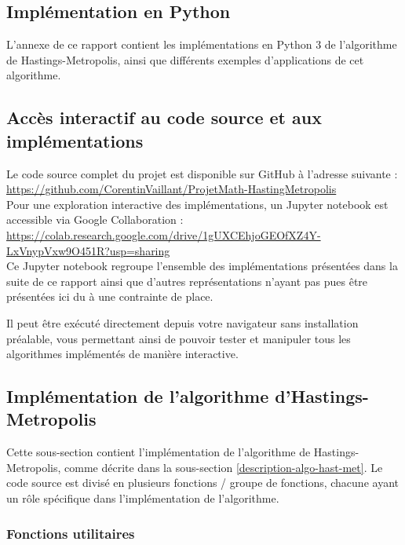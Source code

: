 \documentclass{article}
\begin{document}
\subsection{Implémentation en Python}

L'annexe de ce rapport contient les implémentations en Python 3 de l'algorithme de Hastings-Metropolis, ainsi que différents exemples d'applications de cet algorithme.

\subsection{Accès interactif au code source et aux implémentations}
Le code source complet du projet est disponible sur GitHub à l'adresse suivante : \url{https://github.com/CorentinVaillant/ProjetMath-HastingMetropolis} \\

Pour une exploration interactive des implémentations, un Jupyter notebook est accessible via Google Collaboration : \url{https://colab.research.google.com/drive/1gUXCEhjoGEOfXZ4Y-LxVnypVxw9O451R?usp=sharing} \\

Ce Jupyter notebook regroupe l'ensemble des implémentations présentées dans la suite de ce rapport ainsi que d'autres représentations n'ayant pas pues être présentées ici du à une contrainte de place.

Il peut être exécuté directement depuis votre navigateur sans installation préalable, vous permettant ainsi de pouvoir tester et manipuler tous les algorithmes implémentés de manière interactive.

\newpage
\subsection{Implémentation de l'algorithme d'Hastings-Metropolis}

Cette sous-section contient l'implémentation de l'algorithme de Hastings-Metropolis, comme décrite dans la sous-section \ref{description-algo-hast-met}. Le code source est divisé en plusieurs fonctions / groupe de fonctions, chacune ayant un rôle spécifique dans l'implémentation de l'algorithme.

\subsubsection{Fonctions utilitaires}
\end{document}

